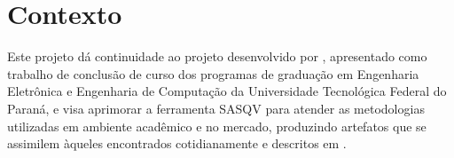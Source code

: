 \chapter{Contexto}

Este projeto dá continuidade ao projeto desenvolvido por \cite{sasqv}, apresentado como trabalho de conclusão de curso dos programas de graduação em Engenharia Eletrônica e Engenharia de Computação da Universidade Tecnológica Federal do Paraná, e visa aprimorar a ferramenta SASQV para atender as metodologias utilizadas em ambiente acadêmico e no mercado, produzindo artefatos que se assimilem àqueles encontrados cotidianamente e descritos em \cite{albini, vqeg}.

